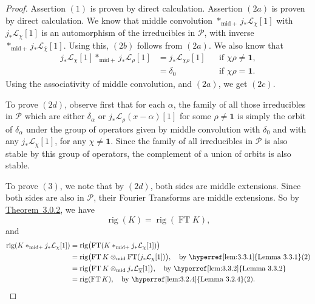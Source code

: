 \begin{proof}
Assertion \((1)\) is proven by direct calculation. Assertion \((2a)\) is
proven by direct calculation. We know that middle convolution
\(*_{\mathrm{mid}+}j_*\mathcal{L}_{\chi}[1]\) with
\(j_*\mathcal{L}_{\chi}[1]\) is an automorphism of the irreducibles in
\(\mathcal{P}\), with inverse
\(*_{\mathrm{mid}+}j_*\mathcal{L}_{\overline{\chi}}[1]\). Using this,
\((2b)\) follows from \((2a)\). We also know that
\[
\begin{aligned}
  j_*\mathcal{L}_{\chi}[1]*_{\mathrm{mid}+}j_*\mathcal{L}_{\rho}[1]
  &=
  j_*\mathcal{L}_{\chi\rho}[1] &&\text{if }\chi\rho\ne\mathbf{1},\\
  &=\delta_0 &&\text{if }\chi\rho=\mathbf{1}.
\end{aligned}
\]
Using the associativity of middle convolution, and \((2a)\), we get \((2c)\).

To prove \((2d)\), observe first that for each \(\alpha\), the family of all
those irreducibles in \(\mathcal{P}\) which are either \(\delta_\alpha\) or
\(j_*\mathcal{L}_\rho(x-\alpha)[1]\) for some \(\rho\ne\mathbf{1}\) is simply
the orbit of \(\delta_\alpha\) under the group of operators given by middle
convolution with \(\delta_0\) and with any \(j_*\mathcal{L}_{\chi}[1]\), for
any \(\chi\ne\mathbf{1}\). Since the family of all irreducibles in
\(\mathcal{P}\) is also stable by this group of operators, the complement of
a union of orbits is also stable.

To prove \((3)\), we note that by \((2d)\), both sides are middle extensions.
Since both sides are also in \(\mathcal{P}\), their Fourier Transforms are
middle extensions. So by \hyperref[thm:3.0.2]{Theorem~3.0.2}, we have
\[
  \operatorname{rig}(K)=\operatorname{rig}(\operatorname{FT}K),
\]
and
\[
\begin{aligned}
  \operatorname{rig}(K*_{\mathrm{mid}+}j_*\mathcal{L}_{\chi}[1])
  &=
  \operatorname{rig}\bigl(\operatorname{FT}
  (K*_{\mathrm{mid}+}j_*\mathcal{L}_{\chi}[1])\bigr)\\
  &=
  \operatorname{rig}\bigl(\operatorname{FT}K\otimes_{\mathrm{mid}}
  \operatorname{FT}(j_*\mathcal{L}_{\chi}[1])\bigr),
  \quad\text{by \hyperref[lem:3.3.1]{Lemma~3.3.1}(2)}\\
  &=
  \operatorname{rig}\bigl(\operatorname{FT}K\otimes_{\mathrm{mid}}
  j_*\mathcal{L}_{\overline{\chi}}[1]\bigr),
  \quad\text{by \hyperref[lem:3.3.2]{Lemma~3.3.2}}\\
  &=
  \operatorname{rig}(\operatorname{FT}K),
  \quad\text{by \hyperref[lem:3.2.4]{Lemma~3.2.4}(2)}.
\end{aligned}
\]
\end{proof}

